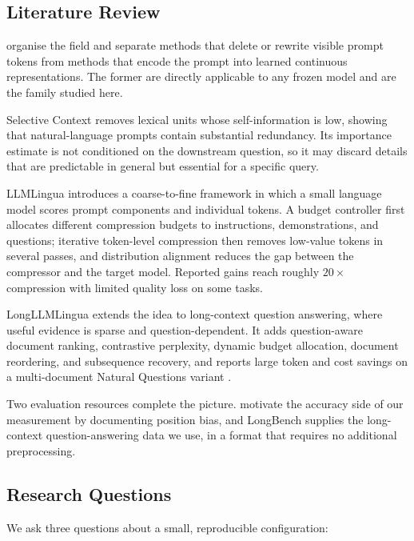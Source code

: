 ﻿\documentclass[10pt,a4paper,twocolumn]{article}
\begin{document}
\subsection{Literature Review}

\citet{li-etal-2025-prompt-survey} organise the field and separate methods that
delete or rewrite visible prompt tokens from methods that encode the prompt into
learned continuous representations. The former are directly applicable to any
frozen model and are the family studied here.

Selective Context \citep{li-etal-2023-compressing} removes lexical units whose
self-information is low, showing that natural-language prompts contain
substantial redundancy. Its importance estimate is not conditioned on the
downstream question, so it may discard details that are predictable in general but
essential for a specific query.

LLMLingua \citep{jiang-etal-2023-llmlingua} introduces a coarse-to-fine framework
in which a small language model scores prompt components and individual tokens.
A budget controller first allocates different compression budgets to instructions,
demonstrations, and questions; iterative token-level compression then removes
low-value tokens in several passes, and distribution alignment reduces the gap
between the compressor and the target model. Reported gains reach roughly
$20\times$ compression with limited quality loss on some tasks.

LongLLMLingua \citep{jiang-etal-2024-longllmlingua} extends the idea to
long-context question answering, where useful evidence is sparse and
question-dependent. It adds question-aware document ranking, contrastive
perplexity, dynamic budget allocation, document reordering, and subsequence
recovery, and reports large token and cost savings on a multi-document Natural
Questions variant \citep{kwiatkowski-etal-2019-natural}.

Two evaluation resources complete the picture. \citet{liu-etal-2024-lost}
motivate the accuracy side of our measurement by documenting position bias, and
LongBench \citep{bai-etal-2024-longbench} supplies the long-context
question-answering data we use, in a format that requires no additional
preprocessing.

\subsection{Research Questions}

We ask three questions about a small, reproducible configuration:
\end{document}
